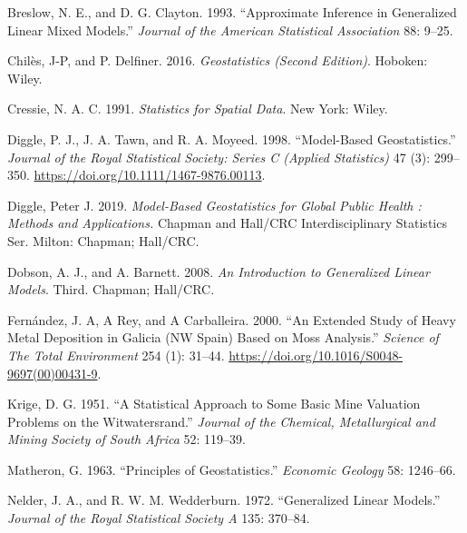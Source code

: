 \documentclass[
  letterpaper,
]{krantz}
\newlength{\cslhangindent}
\newlength{\cslentryspacingunit} %
\newenvironment{CSLReferences}[2] %
 {%
  \setlength{\parindent}{0pt}
  \ifodd #1
  \let\oldpar\par
  \def\par{\hangindent=\cslhangindent\oldpar}
  \fi
  \setlength{\parskip}{#2\cslentryspacingunit}
 }%
 {}
\begin{document}
\hypertarget{refs}{}
\begin{CSLReferences}{1}{0}
\leavevmode{}%
Breslow, N. E., and D. G. Clayton. 1993. {``Approximate Inference in
Generalized Linear Mixed Models.''} \emph{Journal of the American
Statistical Association} 88: 9--25.

\leavevmode{}%
Chilès, J-P, and P. Delfiner. 2016. \emph{Geostatistics (Second
Edition)}. Hoboken: Wiley.

\leavevmode{}%
Cressie, N. A. C. 1991. \emph{Statistics for Spatial Data}. New York:
Wiley.

\leavevmode{}%
Diggle, P. J., J. A. Tawn, and R. A. Moyeed. 1998. {``Model-Based
Geostatistics.''} \emph{Journal of the Royal Statistical Society: Series
C (Applied Statistics)} 47 (3): 299--350.
\url{https://doi.org/10.1111/1467-9876.00113}.

\leavevmode{}%
Diggle, Peter J. 2019. \emph{Model-Based Geostatistics for Global Public
Health : Methods and Applications.} Chapman and Hall/CRC
Interdisciplinary Statistics Ser. Milton: Chapman; Hall/CRC.

\leavevmode{}%
Dobson, A. J., and A. Barnett. 2008. \emph{An Introduction to
Generalized Linear Models}. Third. Chapman; Hall/CRC.

\leavevmode{}%
Fernández, J. A, A Rey, and A Carballeira. 2000. {``An Extended Study of
Heavy Metal Deposition in Galicia (NW Spain) Based on Moss Analysis.''}
\emph{Science of The Total Environment} 254 (1): 31--44.
\url{https://doi.org/10.1016/S0048-9697(00)00431-9}.

\leavevmode{}%
Krige, D. G. 1951. {``A Statistical Approach to Some Basic Mine
Valuation Problems on the Witwatersrand.''} \emph{Journal of the
Chemical, Metallurgical and Mining Society of South Africa} 52: 119--39.

\leavevmode{}%
Matheron, G. 1963. {``Principles of Geostatistics.''} \emph{Economic
Geology} 58: 1246--66.

\leavevmode{}%
Nelder, J. A., and R. W. M. Wedderburn. 1972. {``Generalized Linear
Models.''} \emph{Journal of the Royal Statistical Society A} 135:
370--84.


\end{CSLReferences}
\end{document}
